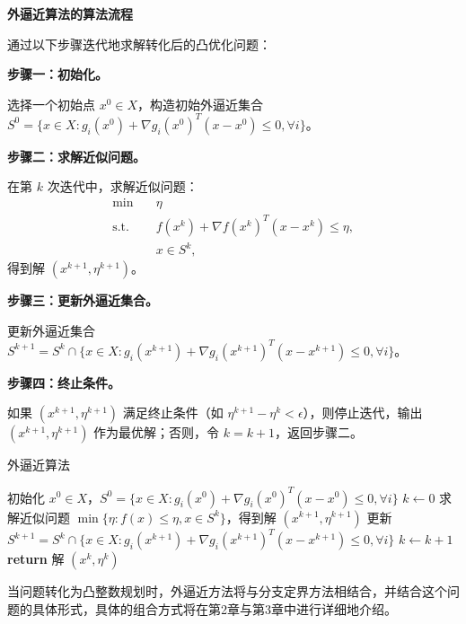 \textbf{外逼近算法的算法流程}

通过以下步骤迭代地求解转化后的凸优化问题：

\textbf{步骤一：初始化。}

选择一个初始点 $x^0 \in X$，构造初始外逼近集合 $S^0 = \{x \in X : g_i(x^0) + \nabla g_i(x^0)^T (x - x^0) \leq 0, \forall i\}$。

\textbf{步骤二：求解近似问题。}

在第 $k$ 次迭代中，求解近似问题：
\begin{align*}
    \min \quad & \eta \\
    \text{s.t.} \quad & f(x^k) + \nabla f(x^k)^T (x - x^k) \leq \eta, \\
                       & x \in S^k,
\end{align*}
得到解 $(x^{k+1}, \eta^{k+1})$。

\textbf{步骤三：更新外逼近集合。}

更新外逼近集合 $S^{k+1} = S^k \cap \{x \in X : g_i(x^{k+1}) + \nabla g_i(x^{k+1})^T (x - x^{k+1}) \leq 0, \forall i\}$。

\textbf{步骤四：终止条件。}

如果 $(x^{k+1}, \eta^{k+1})$ 满足终止条件（如 $\eta^{k+1} - \eta^k < \epsilon$），则停止迭代，输出 $(x^{k+1}, \eta^{k+1})$ 作为最优解；否则，令 $k = k + 1$，返回步骤二。

\begin{algorithm}[!htbp]
    \small
    \caption{外逼近算法}\label{alg:outer_approximation}
    \begin{algorithmic}[1]
        \State 初始化 $x^0 \in X$，$S^0 = \{x \in X : g_i(x^0) + \nabla g_i(x^0)^T (x - x^0) \leq 0, \forall i\}$
        \State $k \gets 0$
        \Repeat
            \State 求解近似问题 $\min\{\eta : f(x) \leq \eta, x \in S^k\}$，得到解 $(x^{k+1}, \eta^{k+1})$
            \State 更新 $S^{k+1} = S^k \cap \{x \in X : g_i(x^{k+1}) + \nabla g_i(x^{k+1})^T (x - x^{k+1}) \leq 0, \forall i\}$
            \State $k \gets k + 1$
        \State \textbf{return} 解 $(x^{k}, \eta^{k})$
        \EndProcedure
    \end{algorithmic}
\end{algorithm}

当问题转化为凸整数规划时，外逼近方法将与分支定界方法相结合，并结合这个问题的具体形式，具体的组合方式将在第2章与第3章中进行详细地介绍。


